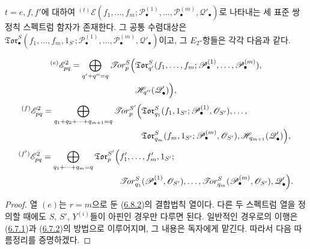\begin{proposition}[6.9.3]
\label{III.6.9.3-fr}
$t=e,f,f'$에 대하여
$ {}^{(t)}\mathscr E(f_1,\ldots,f_m;
\mathscr P_\bullet^{(1)},\ldots,\mathscr P_\bullet^{(m)},
\mathscr Q'_\bullet)$로 나타내는 세 표준 쌍정칙 스펙트럼 함자가
존재한다. 그 공통 수렴대상은
$\mathfrak{Tor}_\bullet^S(f_1,\ldots,f_m,1_{S'};
\mathscr P_\bullet^{(1)},\ldots,\mathscr P_\bullet^{(m)},
\mathscr Q'_\bullet)$이고, 그 $E_2$-항들은 각각 다음과 같다.

\[
\begin{split}
  {}^{(e)}\mathscr E_{pq}^2
  =\bigoplus_{q'+q''=q}
  \mathscr{T}\!or_p^S\Bigl(
  &\mathfrak{Tor}_{q'}^S
  (f_1,\ldots,f_m;
   \mathscr P_\bullet^{(1)},\ldots,\mathscr P_\bullet^{(m)}),\\
  &\mathscr H_{q''}(\mathscr Q'_\bullet)
  \Bigr),
\end{split}
\]
\[
\begin{split}
  {}^{(f)}\mathscr E_{pq}^2
  =\bigoplus_{q_1+q_2+\cdots+q_{m+1}=q}
  \mathscr{T}\!or_p^{S'}\Bigl(
  &\mathfrak{Tor}_{q_1}^S
  (f_1,1_{S'};\mathscr P_\bullet^{(1)},\mathscr O_{S'}),\ldots,\\
  &\mathfrak{Tor}_{q_m}^S
  (f_m,1_{S'};\mathscr P_\bullet^{(m)},\mathscr O_{S'}),
  \mathscr H_{q_{m+1}}(\mathscr Q'_\bullet)
  \Bigr),
\end{split}
\]
\[
\begin{split}
  {}^{(f')}\mathscr E_{pq}^2
  =\bigoplus_{q_1+\cdots+q_m=q}
  \mathfrak{Tor}_p^{S'}\Bigl(
  &f'_1,\ldots,f'_m,1_{S'};\\
  &\mathscr{T}\!or_{q_1}^S
  (\mathscr P_\bullet^{(1)},\mathscr O_{S'}),\ldots,
  \mathscr{T}\!or_{q_m}^S
  (\mathscr P_\bullet^{(m)},\mathscr O_{S'}),
  \mathscr Q'_\bullet
  \Bigr).
\end{split}
\]
\end{proposition}

\begin{proof}
열 $(e)$는 $r=m$으로 둔
(\hyperref[III.6.8.2-fr]{6.8.2})의 결합법칙 열이다. 다른 두
스펙트럼 열을 정의할 때에도 $S$, $S'$, $Y^{(i)}$들이 아핀인
경우만 다루면 된다. 일반적인 경우로의 이행은
(\hyperref[III.6.7.1-fr]{6.7.1})과
(\hyperref[III.6.7.2-fr]{6.7.2})의 방법으로 이루어지며, 그 내용은
독자에게 맡긴다. 따라서 다음 따름정리를 증명하겠다.
\end{proof}

